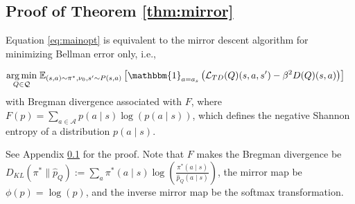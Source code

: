 
\iffalse

\subsection{Proof of Theorem \ref{thm:mirror}}\label{sec:Proofofmirror}

\begin{thm}\label{thm:mirror}
    Equation \ref{eq:mainopt} is equivalent to the mirror descent algorithm for minimizing Bellman error only, i.e., 
    
    \begin{align}
       \underset{Q \in \mathcal{Q}}{\arg\min} &\; \mathbb{E}_{(s, a) \sim \pi^*, \nu_0, s' \sim P(s, a)} \left[\mathbbm{1}_{a = a_s} \left( \mathcal{L}_{TD}(Q)(s,a,s') - \beta^2 D(Q)(s,a)\right) \right]\notag
    \end{align}
   with Bregman divergence associated with $F$, where $F(p)=\sum_{a \in \mathcal{A}} p(a \mid s) \log(p(a \mid s))$, which defines the negative Shannon entropy of a distribution $p(a \mid s)$.
\end{thm}
See Appendix \ref{sec:Proofofmirror} for the proof. Note that $F$ makes the Bregman divergence be $D_{KL}\left(\pi^* \| \hat{p}_Q\right):=\sum_a \pi^*(a \mid s) \log \left(\frac{\pi^*(a \mid s)}{\hat{p}_Q(a \mid s)}\right)$, the mirror map be $\phi(p)=\log(p)$, and the inverse mirror map be the softmax transformation.

